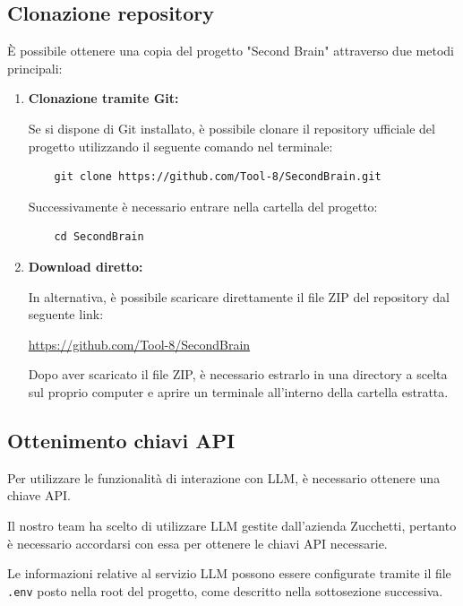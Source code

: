 \documentclass[a4paper,10pt]{article}
\begin{document}
\subsection{Clonazione repository}
È possibile ottenere una copia del progetto "Second Brain" attraverso due metodi principali:
\begin{enumerate}
  \item \textbf{Clonazione tramite Git:}
  
  Se si dispone di Git installato, è possibile clonare il repository ufficiale del progetto utilizzando il seguente comando nel terminale:

  \begin{lstlisting}
    git clone https://github.com/Tool-8/SecondBrain.git
  \end{lstlisting}

  Successivamente è necessario entrare nella cartella del progetto:

  \begin{lstlisting}
    cd SecondBrain
  \end{lstlisting}

  \item \textbf{Download diretto:}
  
  In alternativa, è possibile scaricare direttamente il file ZIP del repository dal seguente link:

  \begin{center}
    \url{https://github.com/Tool-8/SecondBrain}
  \end{center}

  Dopo aver scaricato il file ZIP, è necessario estrarlo in una directory a scelta sul proprio computer e aprire un terminale all'interno della cartella estratta.

\end{enumerate}

\subsection{Ottenimento chiavi API}
Per utilizzare le funzionalità di interazione con LLM, è necessario ottenere una chiave API.

Il nostro team ha scelto di utilizzare LLM gestite dall'azienda Zucchetti, pertanto è necessario accordarsi con essa per ottenere le chiavi API necessarie.

Le informazioni relative al servizio LLM possono essere configurate tramite il file \texttt{.env} posto nella root del progetto, come descritto nella sottosezione successiva.
\end{document}

